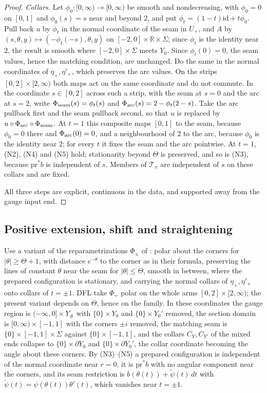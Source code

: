 \documentclass[11pt]{amsart}
\theoremstyle{definition}
\theoremstyle{remark}
\theoremstyle{plain}
\numberwithin{equation}{section}
\newcommand{\RR}{\mathbb R}
\begin{document}
\begin{proof}
\emph{Collars.} Let $\phi_0:[0,\infty)\to[0,\infty)$ be smooth and
nondecreasing, with $\phi_0=0$ on $[0,1]$ and $\phi_0(s)=s$ near and beyond
$2$, and put $\phi_t=(1-t)\mathrm{id}+t\phi_0$. Pull back $u$ by $\phi_t$ in the
normal coordinate of the seam in $U_+$, and $A$ by
$(s,\theta,y)\mapsto(-\phi_t(-s),\theta,y)$ on $[-2,0]\times\RR\times\Sigma$;
since $\phi_t$ is the identity near $2$, the result is smooth where
$[-2,0]\times\Sigma$ meets $Y_0$. Since $\phi_t(0)=0$, the seam values, hence
the matching condition, are unchanged. Do the same in the normal
coordinates of $\eta_+,\eta'_+$, which preserves the arc values. On the
strips $[0,2]\times[2,\infty)$ both maps act on the same coordinate and do
not commute. In the coordinate $s\in[0,2]$ across such a strip, with the
seam at $s=0$ and the arc at $s=2$, write
$\Phi_{\rm seam}(s)=\phi_t(s)$ and $\Phi_{\rm arc}(s)=2-\phi_t(2-s)$. Take
the arc pullback first and the seam pullback second, so that $u$ is
replaced by $u\circ\Phi_{\rm arc}\circ\Phi_{\rm seam}$. At $t=1$ this
composite maps $[0,1]$ to the seam, because $\phi_0=0$ there and
$\Phi_{\rm arc}(0)=0$, and a neighbourhood of $2$ to the arc, because
$\phi_0$ is the identity near $2$; for every $t$ it fixes the seam and
the arc pointwise. At $t=1$, (N2), (N4) and (N5) hold; stationarity
beyond $\Theta$ is preserved, and so is (N3), because $\mathrm{pr}^*b$ is
independent of $s$. Members of $\mathcal T_x$ are independent of $s$ on
these collars and are fixed.

All three steps are explicit, continuous in the data, and supported away
from the gauge input end.
\end{proof}

\subsection{Positive extension, shift and straightening}\label{app:shift-shift}
Use a variant of the reparametrizations $\Phi_\pm$ of
\cite[Section~4.4]{DFL}: polar about the corners for $|\theta|\ge\Theta+1$,
with distance $e^{-\theta}$ to the corner as in their formula, preserving
the lines of constant $\theta$ near the seam for $|\theta|\le\Theta$,
smooth in between, where the prepared configuration is stationary, and
carrying the normal collars of $\eta_+,\eta'_+$ onto collars of
$t=\pm1$. DFL take $\Phi_+$ polar on the whole arms
$[0,2]\times[2,\infty)$; the present variant depends on $\Theta$, hence on
the family. In these coordinates the gauge region is
$(-\infty,0]\times Y_\#$ with $\{0\}\times Y_0$ and $\{0\}\times Y_0'$
removed, the section domain is $[0,\infty)\times[-1,1]$ with the corners
$\pm i$ removed, the matching seam is $\{0\}\times[-1,1]\times\Sigma$ against
$\{0\}\times[-1,1]$, and the collars $C_Y,C_{Y'}$ of the mixed ends collapse
to $\{0\}\times\partial Y_0$ and $\{0\}\times\partial Y_0'$, the collar
coordinate becoming the angle about these corners. By (N3)--(N5) a prepared
configuration is independent of the normal coordinate near $r=0$, it is
$\mathrm{pr}^*b$ with no angular component near the corners, and its seam
restriction is $b(\theta(t))+\widetilde\psi(t)\,dt$ with
$\widetilde\psi(t)=\psi(\theta(t))\theta'(t)$, which vanishes near $t=\pm1$.
\end{document}
